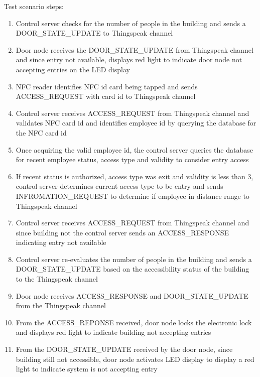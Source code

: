 \noindent
Test scenario steps:
\begin{enumerate}
    \item Control server checks for the number of people in the building and
          sends a DOOR\_STATE\_UPDATE to Thingspeak channel
    \item Door node receives the DOOR\_STATE\_UPDATE from Thingspeak channel and
          since entry not available, displays red light to indicate door node
          not accepting entries on the LED display
    \item NFC reader identifies NFC id card being tapped and sends
          ACCESS\_REQUEST with card id to Thingspeak channel
    \item Control server receives ACCESS\_REQUEST from Thingspeak channel and
          validates NFC card id and identifies employee id by querying the
          database for the NFC card id 
    \item Once acquiring the valid employee id, the control server queries the
          database for recent employee status, access type and validity to
          consider entry access
    \item If recent status is authorized, access type was exit and validity is
          less than 3, control server determines current access type to be entry
          and sends INFROMATION\_REQUEST to determine if employee in distance
          range to Thingspeak channel
    \item Control server receives ACCESS\_REQUEST from Thingspeak channel and
          since building not the control server sends an ACCESS\_RESPONSE
          indicating entry not available
    \item Control server re-evaluates the number of people in the building and
          sends a DOOR\_STATE\_UPDATE based on the accessibility status of the
          building to the Thingspeak channel
    \item Door node receives ACCESS\_RESPONSE and DOOR\_STATE\_UPDATE from the
          Thingspeak channel 
    \item From the ACCESS\_REPONSE received, door node locks the electronic lock
          and displays red light to indicate building not accepting entries 
    \item From the DOOR\_STATE\_UPDATE received by the door node, since building
          still not accessible, door node activates LED display to display a red
          light to indicate system is not accepting entry
\end{enumerate}

